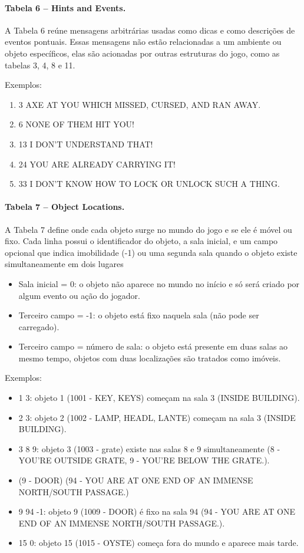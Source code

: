 \documentclass[12pt,a4paper]{article}
\begin{document}
\paragraph{Tabela 6 – Hints and Events.}
A Tabela 6 reúne mensagens arbitrárias usadas como dicas e como descrições de eventos pontuais. Essas mensagens não estão relacionadas a um ambiente ou objeto específicos, elas são acionadas por outras estruturas do jogo, como as tabelas 3, 4, 8 e 11.

Exemplos:
\begin{enumerate}
    \item 3	AXE AT YOU WHICH MISSED, CURSED, AND RAN AWAY.
    \item 6	NONE OF THEM HIT YOU!
    \item 13 I DON'T UNDERSTAND THAT!
    \item 24 YOU ARE ALREADY CARRYING IT!
    \item 33 I DON'T KNOW HOW TO LOCK OR UNLOCK SUCH A THING.
\end{enumerate}

\paragraph{Tabela 7 – Object Locations.}
A Tabela 7 define onde cada objeto surge no mundo do jogo e se ele é móvel ou fixo. Cada linha possui o identificador do objeto, a sala inicial, e um campo opcional que indica imobilidade (-1) ou uma segunda sala quando o objeto existe simultaneamente em dois lugares 

\begin{itemize}
  \item Sala inicial = 0: o objeto não aparece no mundo no início e só será criado por algum evento ou ação do jogador.
  \item Terceiro campo = -1: o objeto está fixo naquela sala (não pode ser carregado).
  \item Terceiro campo = número de sala: o objeto está presente em duas salas ao mesmo tempo, objetos com duas localizações são tratados como imóveis.
\end{itemize}

Exemplos:
\begin{itemize}
  \item 1 3: objeto 1 (1001 - KEY, KEYS) começam na sala 3 (INSIDE BUILDING).
  \item 2 3: objeto 2 (1002 - LAMP, HEADL, LANTE) começam na sala 3 (INSIDE BUILDING).
  \item 3 8 9: objeto 3 (1003 - grate) existe nas salas 8 e 9 simultaneamente (8 - YOU'RE OUTSIDE GRATE, 9 - YOU'RE BELOW THE GRATE.).
  \item (9 - DOOR) (94 - YOU ARE AT ONE END OF AN IMMENSE NORTH/SOUTH PASSAGE.)
  \item 9 94 -1: objeto 9 (1009 - DOOR) é fixo na sala 94 (94 - YOU ARE AT ONE END OF AN IMMENSE NORTH/SOUTH PASSAGE.).
  \item 15 0: objeto 15 (1015 - OYSTE) começa fora do mundo e aparece mais tarde.
\end{itemize}
\end{document}

